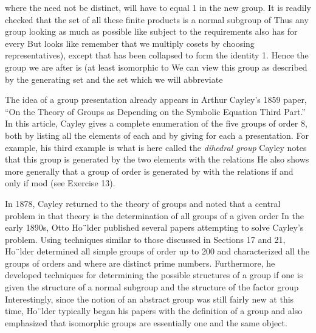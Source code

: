 \documentclass[11pt,oneside]{article}
\begin{document}
\begin{BookBody}
\noindent where the  need not be distinct, will have to equal 1 in the new group. It is readily checked that the set of all these finite products is a normal subgroup  of  Thus any group looking as much as possible like  subject to the requirements  also has  for every  But  looks like remember that we multiply cosets by choosing representatives), except that  has been collapsed to form the identity 1. Hence the group we are after is (at least isomorphic to We can view this group as described by the generating set  and the set  which we will abbreviate 


\noindent The idea of a group presentation already appears in Arthur Cayley’s 1859 paper, “On the Theory of Groups as Depending on the Symbolic Equation  Third Part.” In this article, Cayley gives a complete enumeration of the five groups of order 8, both by listing all the elements of each and by giving for each a presentation. For example, his third example is what is here called the\textit{ dihedral group}  Cayley notes that this group is generated by the two elements \BookInline{\alpha,\allowbreak \beta } with the relations  He also shows more generally that a group of order  is generated by \BookInline{\alpha,\allowbreak \beta } with the relations   if and only if mod  (see Exercise 13).

\noindent In 1878, Cayley returned to the theory of groups and noted that a central problem in that theory is the determination of all groups of a given order  In the early 1890s, Otto Ho¨lder published several papers attempting to solve Cayley’s problem. Using techniques similar to those discussed in Sections 17 and 21, Ho¨lder determined all simple groups of order up to 200 and characterized all the groups of orders  and  where  are distinct prime numbers. Furthermore, he developed techniques for determining the possible structures of a group  if one is given the structure of a normal subgroup  and the structure of the factor group  Interestingly, since the notion of an abstract group was still fairly new at this time, Ho¨lder typically began his papers with the definition of a group and also emphasized that isomorphic groups are essentially one and the same object.


\end{BookBody}
\end{document}
